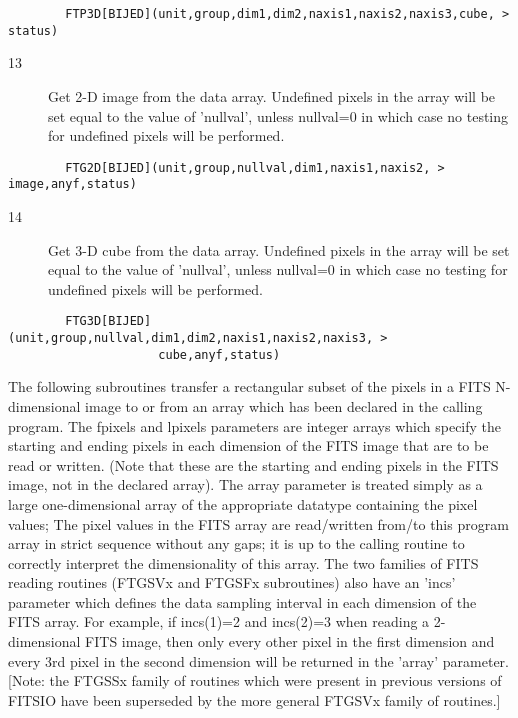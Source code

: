 \documentclass[11pt]{book}
\begin{document}
\begin{verbatim}
        FTP3D[BIJED](unit,group,dim1,dim2,naxis1,naxis2,naxis3,cube, > status)
\end{verbatim}

\begin{description}
\item[13]  Get 2-D image from the data array.  Undefined
     pixels in the array will be set equal to the value of 'nullval',
     unless nullval=0 in which case no testing for undefined pixels will
    be performed.
\end{description}

\begin{verbatim}
        FTG2D[BIJED](unit,group,nullval,dim1,naxis1,naxis2, > image,anyf,status)
\end{verbatim}

\begin{description}
\item[14] Get 3-D cube from the data array.   Undefined
    pixels in the array will be set equal to the value of 'nullval',
    unless nullval=0 in which case no testing for undefined pixels will
   be performed.
\end{description}

\begin{verbatim}
        FTG3D[BIJED](unit,group,nullval,dim1,dim2,naxis1,naxis2,naxis3, >
                     cube,anyf,status)
\end{verbatim}

The following subroutines transfer a rectangular subset of the pixels
in a FITS N-dimensional image to or from an array which has been
declared in the calling program.  The fpixels and lpixels parameters
are integer arrays which specify the starting and ending pixels in each
dimension of the FITS image that are to be read or written.  (Note that
these are the starting and ending pixels in the FITS image, not in the
declared array). The array parameter is treated simply as a large
one-dimensional array of the appropriate datatype containing the pixel
values; The pixel values in the FITS array are read/written  from/to
this program array in strict sequence without any gaps;  it is up to
the calling routine to correctly interpret the dimensionality of this
array.  The two families of FITS reading routines (FTGSVx and FTGSFx
subroutines) also have an 'incs' parameter which defines the
data sampling interval in each dimension of the FITS array.  For
example, if incs(1)=2 and incs(2)=3 when reading a 2-dimensional
FITS image, then only every other pixel in the first dimension
and every 3rd pixel in the second dimension will be returned in
the 'array' parameter. [Note: the FTGSSx family of routines which
were present in previous versions of FITSIO have been superseded
by the more general FTGSVx family of routines.]
\end{document}
